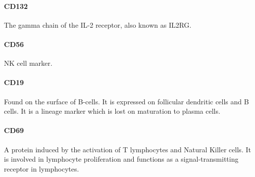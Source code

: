 \paragraph{CD132}
The gamma chain of the IL-2 receptor, also known as IL2RG.

\paragraph{CD56}
NK cell marker.


\paragraph{CD19}
Found on the surface of B-cells.
It is expressed on follicular dendritic cells and B cells.
It is a lineage marker which is lost on maturation to plasma cells.



\paragraph{CD69}
A protein induced by the activation of T lymphocytes and Natural Killer cells.
It is involved in lymphocyte proliferation and functions as a signal-transmitting receptor in lymphocytes.

